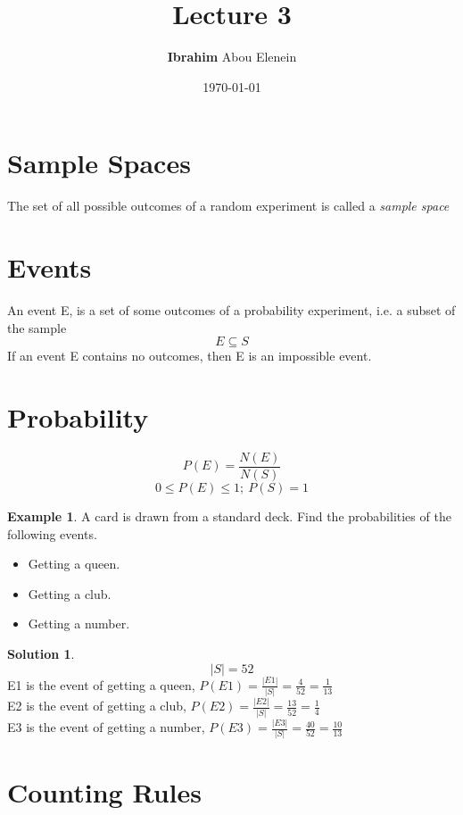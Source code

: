 \documentclass[12pt]{article}
\title{\textbf{Lecture 3}} %
\author{\textbf{Ibrahim} Abou Elenein}
\date{\today} %
\theoremstyle{definition}
\newtheorem{exmp}{Example}[section]
\newtheorem{slo}{Solution}[section]
\begin{document}
\setlength{\droptitle}{-5em}    
\maketitle

\section{Sample Spaces}
The set of all possible outcomes of a random
experiment is called a \textit{sample space}
\section{Events}
An event E, is a set of some outcomes of a
probability experiment, i.e. a subset of the sample
\[
    E \subseteq S
\]
If an event E contains no outcomes, then E is an impossible event.

\section{Probability}
\[
    P(E) = \frac{N(E)}{N(S)}
\]
\[
    0 \leq P (E) \leq 1  ;  \ P(S) = 1 
\]
\begin{exmp}
    A card is drawn from a standard deck.
    Find the probabilities of the following events.
    \begin{itemize}
        \item Getting a queen.
        \item Getting a club.
        \item Getting a number.
    \end{itemize}       

\end{exmp}    
\begin{slo}
    \[
        |S| = 52
    \]
    E1 is the event of getting a queen,
    $\displaystyle P(E1) = \frac{|E1|}{|S|} = \frac{4}{52}=  \frac{1}{13}$
    \\ 
    E2 is the event of getting a club,
    $\displaystyle P(E2) = \frac{|E2|}{|S|} = \frac{13}{52}=  \frac{1}{4}$ \\
    E3 is the event of getting a number,
    $ \displaystyle P(E3) = \frac{|E3|}{|S|} = \frac{40}{52}=  \frac{10}{13}$ \\


\end{slo}

\section{Counting Rules}
\end{document}
